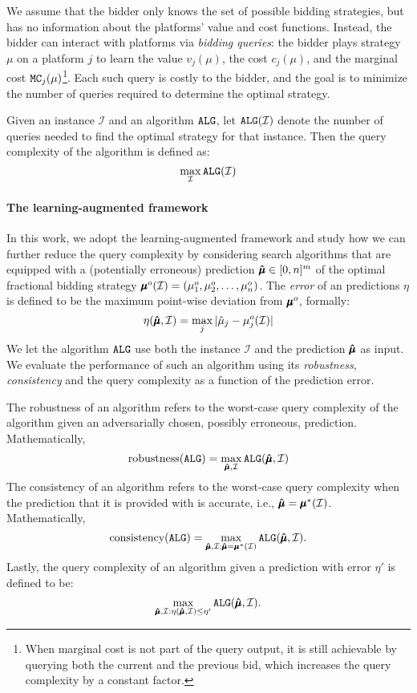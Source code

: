 We assume that the bidder only knows the set of possible bidding strategies, but has no information about the platforms' value and cost functions. Instead, the bidder can interact with platforms via \emph{bidding queries}: the bidder plays strategy $\mu$ on a platform $j$ to learn the value $v_j(\mu)$, the cost $c_j(\mu)$, and the marginal cost $\texttt{MC}_j(\mu)$\footnote{When marginal cost is not part of the query output, it is still achievable by querying both the current and the previous bid, which increases the query complexity by a constant factor.}.
Each such query is costly to the bidder, and the goal is to minimize the number of queries required to determine the optimal strategy. 

Given an instance $\mathcal{I}$ and
an algorithm $\texttt{ALG}$, let $\texttt{ALG}(\mathcal{I})$ denote the number of queries needed to find the optimal strategy for that instance. Then the query complexity of the algorithm is defined as:
\[\max_{\mathcal{I}} \texttt{ALG}(\mathcal{I})\]

\paragraph{The learning-augmented framework} In this work, we adopt the learning-augmented framework and study how we can further reduce the query complexity by considering search algorithms that are equipped with a (potentially erroneous) prediction $\mathbf{\hat{\pmb{\mu}}} \in [0,n]^m$ of the  optimal fractional bidding strategy $\mathbf{\pmb{\mu}}^o(\mathcal{I}) = (\mu^o_1, \mu^o_2,\dots, \mu^o_n)$. The \emph{error} of an predictions $\eta$ is defined to be the maximum point-wise deviation from $\mathbf{\pmb{\mu}}^o$, formally:
\[\eta(\mathbf{\hat{\pmb{\mu}}},\mathcal{I}) = \max_{j}|\hat{\mu}_j - \mu^o_j(\mathcal{I})|\]
We let the algorithm $\texttt{ALG}$ use both the instance $\mathcal{I}$ and the prediction $\mathbf{\hat{\pmb{\mu}}}$ as input. We evaluate the performance of such an algorithm using its \emph{robustness}, \emph{consistency} and the query complexity as a function of the prediction error. 

The robustness of an algorithm refers to the worst-case query complexity of the algorithm
given an adversarially chosen, possibly erroneous, prediction. Mathematically,
\[\text{robustness}(\texttt{ALG}) = \max_{\mathbf{\hat{\pmb{\mu}}}, \mathcal{I}} \texttt{ALG}(\mathbf{\hat{\pmb{\mu}}}, \mathcal{I})\]
The consistency of an algorithm refers to the worst-case query complexity
when the prediction that it is provided with is accurate, i.e., $\mathbf{\hat{\pmb{\mu}}} = \mathbf{\pmb{\mu}}^*(\mathcal{I})$. Mathematically,
\[\text{consistency}(\texttt{ALG}) = \max_{\mathbf{\hat{\pmb{\mu}}}, \mathcal{I}: \mathbf{\hat{\pmb{\mu}}} = \mathbf{\pmb{\mu}}^*(\mathcal{I})} \texttt{ALG}(\mathbf{\hat{\pmb{\mu}}}, \mathcal{I}).\]
Lastly, the query complexity of an algorithm given a prediction with error $\eta'$ is defined to be:
\[\max_{\mathbf{\hat{\pmb{\mu}}}, \mathcal{I}: \eta(\mathbf{\hat{\pmb{\mu}}},\mathcal{I}) \leq \eta'} \texttt{ALG}(\mathbf{\hat{\pmb{\mu}}}, \mathcal{I}).\]